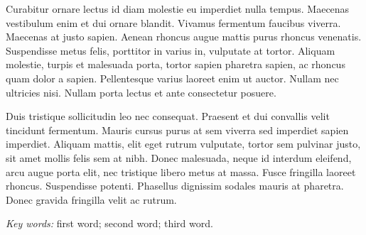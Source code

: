 Curabitur ornare lectus id diam molestie eu imperdiet nulla tempus. Maecenas vestibulum enim et dui ornare blandit. Vivamus fermentum faucibus viverra. Maecenas at justo sapien. Aenean rhoncus augue mattis purus rhoncus venenatis. Suspendisse metus felis, porttitor in varius in, vulputate at tortor. Aliquam molestie, turpis et malesuada porta, tortor sapien pharetra sapien, ac rhoncus quam dolor a sapien. Pellentesque varius laoreet enim ut auctor. Nullam nec ultricies nisi. Nullam porta lectus et ante consectetur posuere.

Duis tristique sollicitudin leo nec consequat. Praesent et dui convallis velit tincidunt fermentum. Mauris cursus purus at sem viverra sed imperdiet sapien imperdiet. Aliquam mattis, elit eget rutrum vulputate, tortor sem pulvinar justo, sit amet mollis felis sem at nibh. Donec malesuada, neque id interdum eleifend, arcu augue porta elit, nec tristique libero metus at massa. Fusce fringilla laoreet rhoncus. Suspendisse potenti. Phasellus dignissim sodales mauris at pharetra. Donec gravida fringilla velit ac rutrum.

\bigskip
\noindent
\textit{Key words:} first word; second word; third word.

\checklanguage
\endinput 